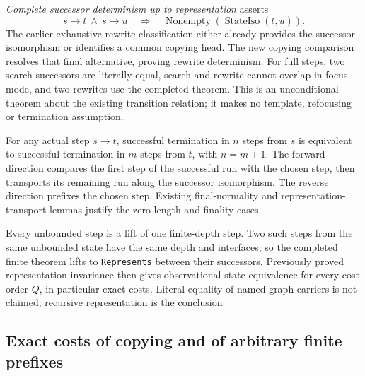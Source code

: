 

\emph{Complete successor determinism up to representation} asserts
\[
 s\to t\ \wedge\ s\to u\quad\Longrightarrow\quad
 \operatorname{Nonempty}(\operatorname{StateIso}(t,u)).
\]
The earlier exhaustive rewrite classification either already provides the
successor isomorphism or identifies a common copying head. The new copying
comparison resolves that final alternative, proving rewrite determinism.
For full steps, two search successors are literally equal, search and rewrite
cannot overlap in focus mode, and two rewrites use the completed theorem.
This is an unconditional theorem about the existing transition relation;
it makes no template, refocusing or termination assumption.



For any actual step $s\to t$, successful termination in $n$ steps from $s$
is equivalent to successful termination in $m$ steps from $t$, with $n=m+1$.
The forward direction compares the first step of the successful run with the
chosen step, then transports its remaining run along the successor isomorphism.
The reverse direction prefixes the chosen step. Existing final-normality and
representation-transport lemmas justify the zero-length and finality cases.


Every unbounded step is a lift of one finite-depth step. Two such steps from
the same unbounded state have the same depth and interfaces, so the completed
finite theorem lifts to \texttt{Represents} between their successors. Previously
proved representation invariance then gives observational state equivalence
for every cost order $Q$, in particular exact costs. Literal equality of
named graph carriers is not claimed; recursive representation is the conclusion.



\subsection{Exact costs of copying and of arbitrary finite prefixes}

